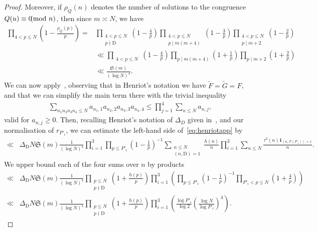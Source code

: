 \documentclass[12pt]{amsart}
\theoremstyle{definition}
\theoremstyle{remark}
\numberwithin{equation}{section}
\newcommand{\1}{\mathbf{1}}
\let\oldpmod\pmod
\renewcommand{\pmod}[1]{\hspace{-0.12cm}\oldpmod {#1}}
\begin{document}
\begin{proof}
    Moreover, if $\rho_{Q}(n)$ denotes the number of solutions to the congruence $Q(u)\equiv 0\pmod n$, then since $m\asymp N$, we have
    \begin{align*}
        \prod_{4<p\leq N}\left(1-\frac{\rho_{Q}(p)}{p}\right)=&\prod_{\substack{4<p\leq  N\\p\nmid \mathrm{D}}}\left(1-\frac{4}{p}\right)\prod_{\substack{4<p\leq  N\\p\mid m(m+4)}}\left(1-\frac{3}{p}\right)\prod_{\substack{4<p\leq  N\\p\mid m+2}}\left(1-\frac{2}{p}\right)\\
        &\ll \prod_{\substack{4<p\leq  N}}\left(1-\frac{4}{p}\right) \prod_{p\mid m(m+4)}\left(1+\frac{1}{p}\right)\prod_{p\mid m+2}\left(1+\frac{2}{p}\right)\\
        &\ll \frac{\mathfrak{S}(m)}{(\log N)^4}.
    \end{align*}
    We can now apply~\cite[Corollary 1]{henriot}, observing that in Henriot's notation we have $\widetilde{F}=\widetilde{G}=F$, and that we can simplify the main term there with the trivial inequality
    \begin{align*}
        \sum_{n_1n_2n_3n_4\leq N}a_{n_1,1}a_{n_2,2}a_{n_3,3}a_{n_4,4}\leq \prod_{j=1}^4 \sum_{n\leq N}a_{n,j},
    \end{align*} 
    valid for $a_{n,j}\geq 0$.
    Then, recalling Henriot's notation of $\Delta_D$ given in~\cite[eq. (1.3)]{henriot}, and our normalisation of $r_{P'_i}$, we can estimate the left-hand side of~\eqref{eq:henriotapp} by
	\begin{align*}
		\ll& \Delta_\mathrm{D} N \mathfrak{S}(m) \frac{1}{(\log N)^4}\prod_{i=1}^3\prod_{p\leq P'_i}\left(1-\frac{1}{p}\right)^{-1} \sum_{\substack{n\leq  N\\ (n,\mathrm{D})=1}}\frac{h(n)}{n}\prod_{i=1}^3 \sum_{n\leq  N}\frac{\tau^2(n) \1_{(n,\mathcal{P}(P'_i))=1}}{n}.
        \end{align*}
    We upper bound each of the four sums over $n$ by products
    \begin{align*}
        \ll& \Delta_\mathrm{D} N \mathfrak{S}(m) \frac{1}{(\log N)^4} \prod_{\substack{p\leq N\\ p\nmid \mathrm{D}}}\left(1+\frac{h(p)}{p}\right) \prod_{i=1}^3 \left( \prod_{p\leq P'_i}\left(1-\frac{1}{p}\right)^{-1}  \prod_{P'_i<p\leq N} \left(1+\frac{4}{p}\right) \right)\\  
        \ll& \Delta_\mathrm{D} N \mathfrak{S}(m) \frac{1}{(\log N)^4} \prod_{\substack{p\leq N\\ p\nmid \mathrm{D}}} \left(1+\frac{h(p)}{p}\right) \prod_{i=1}^3  \left(\frac{\log P'_i}{\log 2} \left(\frac{\log N}{\log P'_i}\right)^4 \right).

\end{align*}
\end{proof}
\end{document}
